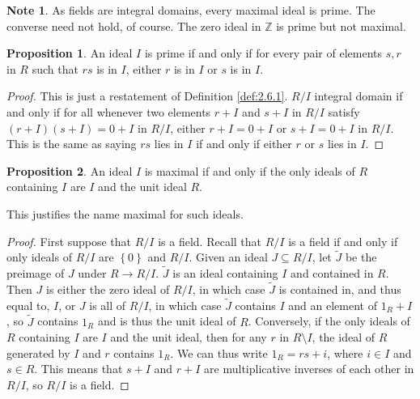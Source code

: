 \documentclass{article}
\newcommand{\Z}{\mathbb{Z}}
\newcommand{\rb}[1]{\left( #1 \right)}
\newcommand{\cb}[1]{\left\{ #1 \right\}}
\theoremstyle{definition}\newtheorem{definition}{Definition}[subsection]
\theoremstyle{definition}\newtheorem{remark}[definition]{Remark}
\theoremstyle{definition}\newtheorem*{example}{Example}
\theoremstyle{definition}\newtheorem*{note}{Note}
\newtheorem{proposition}[definition]{Proposition}
\begin{document}
\begin{note}
As fields are integral domains, every maximal ideal is prime. The converse need not hold, of course. The zero ideal in $ \Z $ is prime but not maximal.
\end{note}

\begin{proposition}
An ideal $ I $ is prime if and only if for every pair of elements $ s, r $ in $ R $ such that $ rs $ is in $ I $, either $ r $ is in $ I $ or $ s $ is in $ I $.
\end{proposition}

\begin{proof}
This is just a restatement of Definition \ref{def:2.6.1}. $ R / I $ integral domain if and only if for all whenever two elements $ r + I $ and $ s + I $ in $ R / I $ satisfy $ \rb{r + I}\rb{s + I} = 0 + I $ in $ R / I $, either $ r + I = 0 + I $ or $ s + I = 0 + I $ in $ R / I $. This is the same as saying $ rs $ lies in $ I $ if and only if either $ r $ or $ s $ lies in $ I $.
\end{proof}

\begin{proposition}
An ideal $ I $ is maximal if and only if the only ideals of $ R $ containing $ I $ are $ I $ and the unit ideal $ R $.
\end{proposition}

This justifies the name maximal for such ideals.

\begin{proof}
First suppose that $ R / I $ is a field. Recall that $ R / I $ is a field if and only if only ideals of $ R / I $ are $ \cb{0} $ and $ R / I $. Given an ideal $ J \subseteq R / I $, let $ \widetilde{J} $ be the preimage of $ J $ under $ R \to R / I $. $ \widetilde{J} $ is an ideal containing $ I $ and contained in $ R $. Then $ J $ is either the zero ideal of $ R / I $, in which case $ \widetilde{J} $ is contained in, and thus equal to, $ I $, or $ J $ is all of $ R / I $, in which case $ \widetilde{J} $ contains $ I $ and an element of $ 1_R + I $, so $ \widetilde{J} $ contains $ 1_R $ and is thus the unit ideal of $ R $. Conversely, if the only ideals of $ R $ containing $ I $ are $ I $ and the unit ideal, then for any $ r $ in $ R \setminus I $, the ideal of $ R $ generated by $ I $ and $ r $ contains $ 1_R $. We can thus write $ 1_R = rs + i $, where $ i \in I $ and $ s \in R $. This means that $ s + I $ and $ r + I $ are multiplicative inverses of each other in $ R / I $, so $ R / I $ is a field.
\end{proof}
\end{document}
